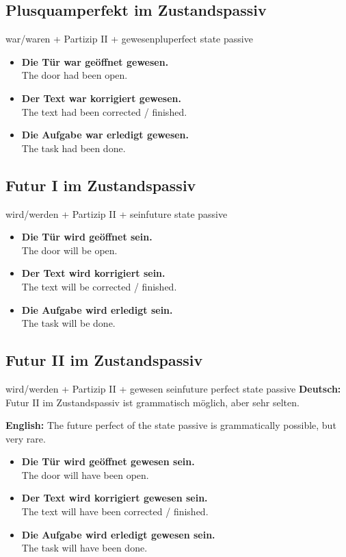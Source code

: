 \documentclass[a4paper,11pt]{article}
\newcommand{\GermanText}[1]{\textbf{Deutsch: }#1\par}
\newcommand{\EnglishText}[1]{{\small\color{SoftGray}\textbf{English: }#1\par}}
\newcommand{\ExampleItem}[2]{\item \textbf{#1}\\{\small\color{SoftGray}#2}}
\begin{document}
\subsection{Plusquamperfekt im Zustandspassiv}

\begin{grammarentry}{war/waren + Partizip II + gewesen}{pluperfect state passive}
\begin{exbox}
\begin{itemize}
    \ExampleItem{Die Tür war geöffnet gewesen.}{The door had been open.}
    \ExampleItem{Der Text war korrigiert gewesen.}{The text had been corrected / finished.}
    \ExampleItem{Die Aufgabe war erledigt gewesen.}{The task had been done.}
\end{itemize}
\end{exbox}
\end{grammarentry}

\subsection{Futur I im Zustandspassiv}

\begin{grammarentry}{wird/werden + Partizip II + sein}{future state passive}
\begin{exbox}
\begin{itemize}
    \ExampleItem{Die Tür wird geöffnet sein.}{The door will be open.}
    \ExampleItem{Der Text wird korrigiert sein.}{The text will be corrected / finished.}
    \ExampleItem{Die Aufgabe wird erledigt sein.}{The task will be done.}
\end{itemize}
\end{exbox}
\end{grammarentry}

\subsection{Futur II im Zustandspassiv}

\begin{grammarentry}{wird/werden + Partizip II + gewesen sein}{future perfect state passive}
\GermanText{Futur II im Zustandspassiv ist grammatisch möglich, aber sehr selten.}
\EnglishText{The future perfect of the state passive is grammatically possible, but very rare.}

\begin{exbox}
\begin{itemize}
    \ExampleItem{Die Tür wird geöffnet gewesen sein.}{The door will have been open.}
    \ExampleItem{Der Text wird korrigiert gewesen sein.}{The text will have been corrected / finished.}
    \ExampleItem{Die Aufgabe wird erledigt gewesen sein.}{The task will have been done.}
\end{itemize}
\end{exbox}
\end{grammarentry}
\end{document}

